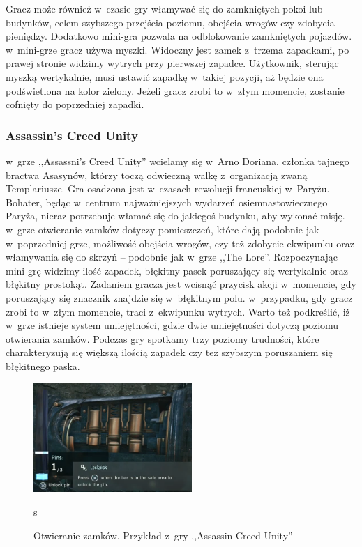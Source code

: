 \documentclass[oneside,polski,logo]{amuthesis}
\begin{document}
Gracz może również w~czasie gry włamywać się do zamkniętych pokoi lub budynków, celem szybszego przejścia poziomu, obejścia wrogów czy zdobycia pieniędzy. Dodatkowo mini-gra pozwala na odblokowanie zamkniętych pojazdów. w~mini-grze gracz używa myszki. Widoczny jest zamek z~trzema zapadkami, po prawej stronie widzimy wytrych przy pierwszej zapadce. Użytkownik, sterując myszką wertykalnie, musi ustawić zapadkę w~takiej pozycji, aż będzie ona podświetlona na kolor zielony. Jeżeli gracz zrobi to w~złym momencie, zostanie cofnięty do poprzedniej zapadki. \cite{Mafia2}

\subsubsection{Assassin's Creed Unity}
\par w~grze ,,Assassni's Creed Unity'' wcielamy się w~Arno Doriana, członka tajnego bractwa Asasynów, którzy toczą odwieczną walkę z~organizacją zwaną Templariusze. Gra osadzona jest w~czasach rewolucji francuskiej w~Paryżu. Bohater, będąc w~centrum najważniejszych wydarzeń osiemnastowiecznego Paryża, nieraz potrzebuje włamać się do jakiegoś budynku, aby wykonać misję. w~grze otwieranie zamków dotyczy pomieszczeń, które dają podobnie jak w~poprzedniej grze, możliwość obejścia wrogów, czy też zdobycie ekwipunku oraz włamywania się do skrzyń – podobnie jak w~grze ,,The Lore''. Rozpoczynając mini-grę widzimy ilość zapadek, błękitny pasek poruszający się wertykalnie oraz błękitny prostokąt. Zadaniem gracza jest wcisnąć przycisk akcji w~momencie, gdy poruszający się znacznik znajdzie się w~błękitnym polu. w~przypadku, gdy gracz zrobi to w~złym momencie, traci z~ekwipunku wytrych. Warto też podkreślić, iż w~grze istnieje system umiejętności, gdzie dwie umiejętności dotyczą poziomu otwierania zamków. Podczas gry spotkamy trzy poziomy trudności, które charakteryzują się większą ilością zapadek czy też szybszym poruszaniem się błękitnego paska. \cite{acu}
\begin{figure}[h]
	\centering
	\includegraphics[width=6cm]{images/tyrek/acu.png}
	\caption{Otwieranie zamków. Przykład z~gry ,,Assassin Creed Unity''}s
	\end{figure}
\end{document}
